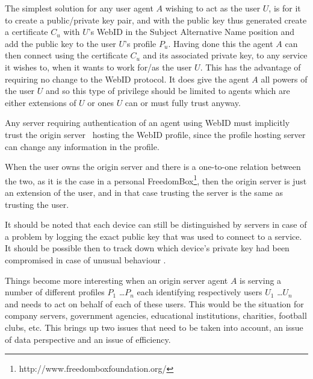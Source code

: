 \documentclass[a4paper]{llncs}
\begin{document}
The simplest solution for any user agent $A$ wishing to act as the user $U$, is for it to create a public/private key pair,  and with the public key thus generated create a certificate $C_u$ with $U$'s WebID in the Subject Alternative Name position and add the public key to the user $U$'s profile $P_u$.
Having done this the agent $A$ can then connect using the certificate $C_u$ and its associated private key, to any service it wishes to, when it wants to work for/as the user $U$.
This has the advantage of requiring no change to the WebID protocol.
It does give the agent $A$ all powers of the user $U$ and so this type of privilege should be limited to agents which are either extensions of $U$ or ones $U$ can or must fully trust anyway.



Any server requiring authentication of an agent using WebID must implicitly trust the origin server~\cite{barth-a-2011--a} hosting the WebID profile, since the profile hosting server can change any information in the profile.

When the user owns the origin server and there is a one-to-one relation between the two, as it is the case in a personal FreedomBox\footnote{http://www.freedomboxfoundation.org/}, then the origin server is just an extension of the user, and in that case trusting the server is the same as trusting the user.

It should be noted that each device can still be distinguished by servers in case of a problem by logging the exact public key that was used to connect to a service. 
It should be possible then to track down which device's private key had been compromised in case of unusual behaviour . 

Things become more interesting when an origin server agent $A$ is serving a number of different profiles $P_1$ \ldots $P_n$ each identifying respectively users $U_1$ \ldots $U_n$ and needs to act on behalf of each of these users.
This would be the situation for company servers, government agencies, educational institutions, charities, football clubs, etc.
This brings up two issues that need to be taken into account, an issue of data perspective and an issue of efficiency. 
\end{document}
